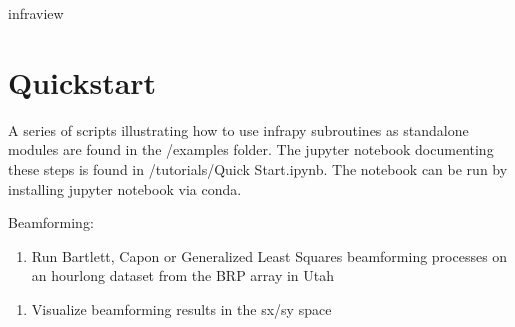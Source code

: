 \documentclass[letterpaper,10pt,english]{sphinxmanual}
\begin{document}
\begin{sphinxVerbatim}[commandchars=\\\{\}]
\PYGZgt{}\PYGZgt{} infraview
\end{sphinxVerbatim}


\section{Quickstart}
\label{\detokenize{quickstart:quickstart}}\label{\detokenize{quickstart:id1}}\label{\detokenize{quickstart::doc}}
A series of scripts illustrating how to use infrapy subroutines as stand\sphinxhyphen{}alone modules are found in the /examples folder.
The jupyter notebook documenting these steps is found in /tutorials/Quick Start.ipynb.  The notebook can be run by installing jupyter notebook via conda.

\begin{sphinxVerbatim}[commandchars=\\\{\}]
    
\end{sphinxVerbatim}

Beamforming:
\begin{enumerate}
%
\item {} 
Run Bartlett, Capon or Generalized Least Squares beamforming processes on an hour\sphinxhyphen{}long dataset from the BRP array in Utah

\end{enumerate}

\begin{sphinxVerbatim}[commandchars=\\\{\}]
  
\end{sphinxVerbatim}
\begin{enumerate}
%
\setcounter{enumi}{1}
\item {} 
Visualize beamforming results in the sx/sy space

\end{enumerate}

\begin{sphinxVerbatim}[commandchars=\\\{\}]
  
\end{sphinxVerbatim}
\end{document}
